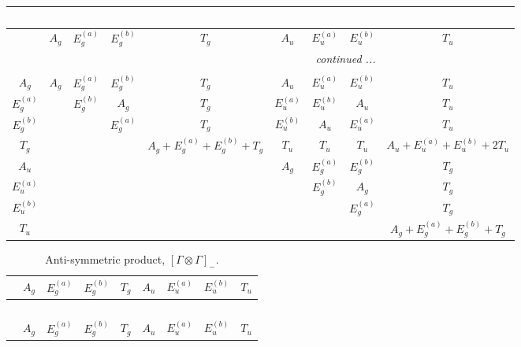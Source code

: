 \documentclass[fleqn,10pt,landscape]{article}
\begin{document}
\begin{itemize}
\begin{center}
\begin{longtable}{c|cccccccc}
\multicolumn{8}{l}{\tablename\ \thetable{}} \\
 \hline \hline
 & $ A_{g} $ & $ E_{g}^{(a)} $ & $ E_{g}^{(b)} $ & $ T_{g} $ & $ A_{u} $ & $ E_{u}^{(a)} $ & $ E_{u}^{(b)} $ & $ T_{u} $ \\ \hline \endhead

 \hline \hline
\multicolumn{8}{r}{\footnotesize\it continued ...} \\ \endfoot

 \hline \hline
\multicolumn{8}{r}{} \\ \endlastfoot

$ A_{g} $ & $ A_{g} $ & $ E_{g}^{(a)} $ & $ E_{g}^{(b)} $ & $ T_{g} $ & $ A_{u} $ & $ E_{u}^{(a)} $ & $ E_{u}^{(b)} $ & $ T_{u} $ \\
$ E_{g}^{(a)} $ & $  $ & $ E_{g}^{(b)} $ & $ A_{g} $ & $ T_{g} $ & $ E_{u}^{(a)} $ & $ E_{u}^{(b)} $ & $ A_{u} $ & $ T_{u} $ \\
$ E_{g}^{(b)} $ & $  $ & $  $ & $ E_{g}^{(a)} $ & $ T_{g} $ & $ E_{u}^{(b)} $ & $ A_{u} $ & $ E_{u}^{(a)} $ & $ T_{u} $ \\
$ T_{g} $ & $  $ & $  $ & $  $ & $ A_{g} + E_{g}^{(a)} + E_{g}^{(b)} + T_{g} $ & $ T_{u} $ & $ T_{u} $ & $ T_{u} $ & $ A_{u} + E_{u}^{(a)} + E_{u}^{(b)} + 2 T_{u} $ \\
$ A_{u} $ & $  $ & $  $ & $  $ & $  $ & $ A_{g} $ & $ E_{g}^{(a)} $ & $ E_{g}^{(b)} $ & $ T_{g} $ \\
$ E_{u}^{(a)} $ & $  $ & $  $ & $  $ & $  $ & $  $ & $ E_{g}^{(b)} $ & $ A_{g} $ & $ T_{g} $ \\
$ E_{u}^{(b)} $ & $  $ & $  $ & $  $ & $  $ & $  $ & $  $ & $ E_{g}^{(a)} $ & $ T_{g} $ \\
$ T_{u} $ & $  $ & $  $ & $  $ & $  $ & $  $ & $  $ & $  $ & $ A_{g} + E_{g}^{(a)} + E_{g}^{(b)} + T_{g} $ \\
\end{longtable}
\end{center}
\begin{center}
\renewcommand{\arraystretch}{1.0}
\begin{longtable}{ccccccccc}
\caption{Anti-symmetric product, $[\Gamma\otimes\Gamma]_-$.}
 \\
 \hline \hline
 & $ A_{g} $ & $ E_{g}^{(a)} $ & $ E_{g}^{(b)} $ & $ T_{g} $ & $ A_{u} $ & $ E_{u}^{(a)} $ & $ E_{u}^{(b)} $ & $ T_{u} $ \\ \hline \endfirsthead

\multicolumn{8}{l}{\tablename\ \thetable{}} \\
 \hline \hline
 & $ A_{g} $ & $ E_{g}^{(a)} $ & $ E_{g}^{(b)} $ & $ T_{g} $ & $ A_{u} $ & $ E_{u}^{(a)} $ & $ E_{u}^{(b)} $ & $ T_{u} $ \\ \hline \endhead


\end{longtable}
\end{center}
\end{itemize}
\end{document}
